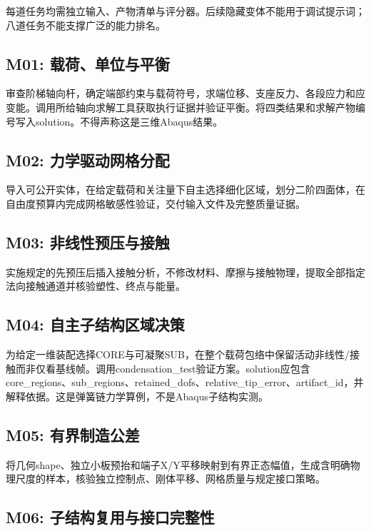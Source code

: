\documentclass[UTF8,a4paper,11pt,fontset=windows]{ctexart}
\begin{document}
每道任务均需独立输入、产物清单与评分器。后续隐藏变体不能用于调试提示词；八道任务不能支撑广泛的能力排名。

\subsection{M01: 载荷、单位与平衡}

审查阶梯轴向杆，确定端部约束与载荷符号，求端位移、支座反力、各段应力和应变能。调用所给轴向求解工具获取执行证据并验证平衡。将四类结果和求解产物编号写入solution。不得声称这是三维Abaqus结果。

\subsection{M02: 力学驱动网格分配}

导入可公开实体，在给定载荷和关注量下自主选择细化区域，划分二阶四面体，在自由度预算内完成网格敏感性验证，交付输入文件及完整质量证据。

\subsection{M03: 非线性预压与接触}

实施规定的先预压后插入接触分析，不修改材料、摩擦与接触物理，提取全部指定法向接触通道并核验塑性、终点与能量。

\subsection{M04: 自主子结构区域决策}

为给定一维装配选择CORE与可凝聚SUB，在整个载荷包络中保留活动非线性/接触而非仅看基线帧。调用condensation\_test验证方案。solution应包含core\_regions、sub\_regions、retained\_dofs、relative\_tip\_error、artifact\_id，并解释依据。这是弹簧链力学算例，不是Abaqus子结构实测。

\subsection{M05: 有界制造公差}

将几何shape、独立小板预抬和端子X/Y平移映射到有界正态幅值，生成含明确物理尺度的样本，核验独立控制点、刚体平移、网格质量与规定接口策略。

\subsection{M06: 子结构复用与接口完整性}
\end{document}
